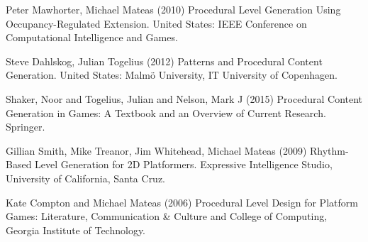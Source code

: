 \documentclass{scrartcl}
\begin{document}
\begin{thebibliography}{9}

	Peter Mawhorter, Michael Mateas (2010) Procedural Level Generation Using Occupancy-Regulated Extension. United States: IEEE Conference on Computational Intelligence and Games.

Steve Dahlskog, Julian Togelius (2012) Patterns and Procedural Content Generation. United States: Malmö University, IT University of Copenhagen.

Shaker, Noor and Togelius, Julian and Nelson, Mark J (2015) Procedural Content Generation in Games: A Textbook and an Overview of Current Research. Springer.

Gillian Smith, Mike Treanor, Jim Whitehead, Michael Mateas (2009) Rhythm-Based Level Generation for 2D Platformers. Expressive Intelligence Studio, University of California, Santa Cruz.

Kate Compton and Michael Mateas (2006) Procedural Level Design for Platform Games: Literature, Communication \& Culture and College of Computing, Georgia Institute of Technology.

\end{thebibliography}
\end{document}
